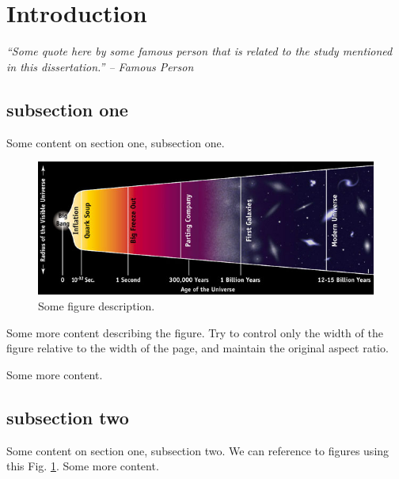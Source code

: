 \section{Introduction}

\emph{``Some quote here by some famous person that is related to the study mentioned in this dissertation.'' -- Famous Person}

\subsection{subsection one}

Some content on section one, subsection one.

\begin{figure}[!h]
\begin{center}
\includegraphics[width=0.8\linewidth]{fig-pics/timeline}
\end{center}
\caption{\label{fig:f1}Some figure description.}
\end{figure}

Some more content describing the figure.
Try to control only the width of the figure relative to the width of the page, and maintain the original aspect ratio.

Some more content.

\subsection{subsection two}

Some content on section one, subsection two.
We can reference to figures using this Fig. \ref{fig:f1}.
Some more content.

\pagebreak